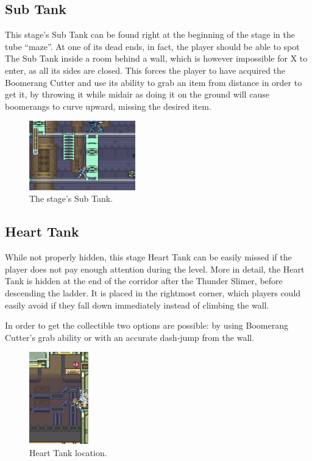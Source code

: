 \subsection{Sub Tank}
This stage's Sub Tank can be found right at the beginning of the stage in the tube ``maze''. At one of its dead ends, in fact, the player should be able to spot The Sub Tank inside a room behind a wall, which is however impossible for X to enter, as all its sides are closed. This forces the player to have acquired the Boomerang Cutter and use its ability to grab an item from distance in order to get it, by throwing it while midair as doing it on the ground will cause boomerangs to curve upward, missing the desired item.
\begin{figure}[htp]
	\centering
	\includegraphics[height=3cm]{figures/X1/Spark_mandrill/Mandrill_tank.jpg}
	\caption{The stage's Sub Tank.}
\end{figure}

\subsection{Heart Tank}
While not properly hidden, this stage Heart Tank can be easily missed if the player does not pay enough attention during the level. More in detail, the Heart Tank is hidden at the end of the corridor after the Thunder Slimer, before descending the ladder. It is placed in the rightmost corner, which players could easily avoid if they fall down immediately instead of climbing the wall.

In order to get the collectible two options are possible: by using Boomerang Cutter's grab ability or with an accurate dash-jump from the wall.
\begin{figure}[htp]
	\centering
	\includegraphics[height=4cm]{figures/X1/Spark_mandrill/Mandrill_heart.jpg}
	\caption{Heart Tank location.}
\end{figure}

